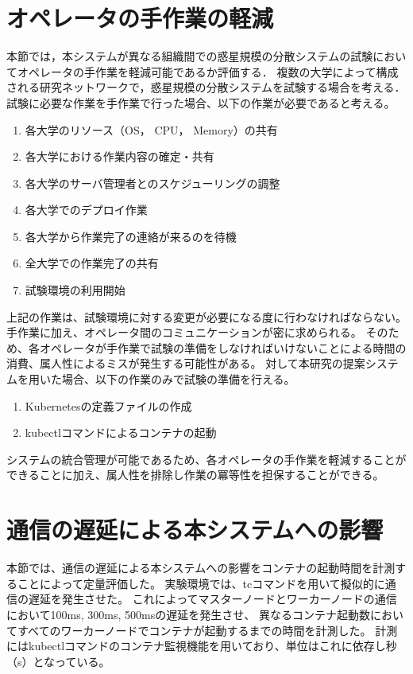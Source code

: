 \section{オペレータの手作業の軽減}

本節では，本システムが異なる組織間での惑星規模の分散システムの試験においてオペレータの手作業を軽減可能であるか評価する．
複数の大学によって構成される研究ネットワークで，惑星規模の分散システムを試験する場合を考える．
試験に必要な作業を手作業で行った場合、以下の作業が必要であると考える。

\begin{enumerate}
  \item 各大学のリソース（OS， CPU， Memory）の共有
  \item 各大学における作業内容の確定・共有
  \item 各大学のサーバ管理者とのスケジューリングの調整
  \item 各大学でのデプロイ作業
  \item 各大学から作業完了の連絡が来るのを待機
  \item 全大学での作業完了の共有
  \item 試験環境の利用開始
\end{enumerate}

上記の作業は、試験環境に対する変更が必要になる度に行わなければならない。
手作業に加え、オペレータ間のコミュニケーションが密に求められる。
そのため、各オペレータが手作業で試験の準備をしなければいけないことによる時間の消費、属人性によるミスが発生する可能性がある。
対して本研究の提案システムを用いた場合、以下の作業のみで試験の準備を行える。

\begin{enumerate}
  \item Kubernetesの定義ファイルの作成
  \item kubectlコマンドによるコンテナの起動
\end{enumerate}

システムの統合管理が可能であるため、各オペレータの手作業を軽減することができることに加え、属人性を排除し作業の冪等性を担保することができる。

\section{通信の遅延による本システムへの影響}

本節では、通信の遅延による本システムへの影響をコンテナの起動時間を計測することによって定量評価した。
実験環境では、tcコマンドを用いて擬似的に通信の遅延を発生させた。
これによってマスターノードとワーカーノードの通信において100ms, 300ms, 500msの遅延を発生させ、
異なるコンテナ起動数においてすべてのワーカーノードでコンテナが起動するまでの時間を計測した。
計測にはkubectlコマンドのコンテナ監視機能を用いており、単位はこれに依存し秒（s）となっている。

